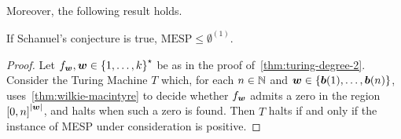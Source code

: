 Moreover, the following result holds.

\begin{theorem}
\label{thm:turing-degree-1}
If Schanuel's conjecture is true, $\mbox{MESP} \leq \emptyset^{(1)}$.
\end{theorem}

\begin{proof}
Let $f_{\boldsymbol{w}}, \boldsymbol{w} \in {\lbrace 1, \ldots, k \rbrace}^{\star}$ be as in the proof of~\cref{thm:turing-degree-2}.
Consider the Turing Machine $T$ which, for each $n \in \mathbb{N}$ and $\boldsymbol{w} \in \lbrace \boldsymbol{b}(1), \ldots, \boldsymbol{b}(n) \rbrace$, uses~\cref{thm:wilkie-macintyre} to decide whether $f_{\boldsymbol{w}}$ admits a zero in the region ${[0,n]}^{\lvert \boldsymbol{w} \rvert}$, and halts when such a zero is found.
Then $T$ halts if and only if the instance of MESP under consideration is positive.
\end{proof}

